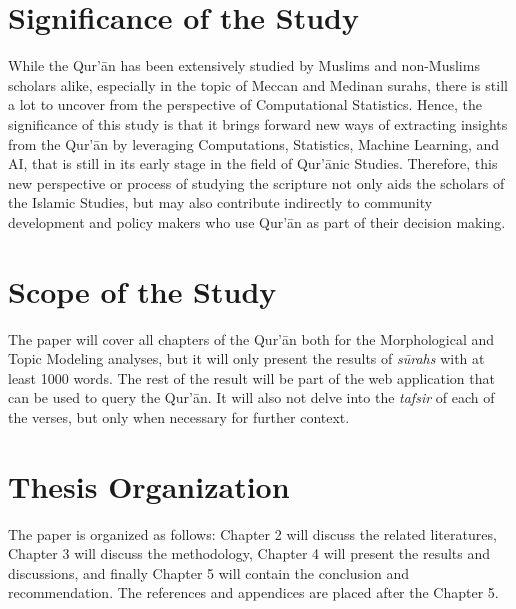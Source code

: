 \section{Significance of the Study}\label{sec:significance}
While the Qur'\=an has been extensively studied by Muslims and non-Muslims scholars alike, especially in the topic of Meccan and Medinan surahs, there is still a lot to uncover from the perspective of Computational Statistics. Hence, the significance of this study is that it brings forward new ways of extracting insights from the Qur'\=an by leveraging Computations, Statistics, Machine Learning, and AI, that is still in its early stage in the field of Qur'\=anic Studies. Therefore, this new perspective or process of studying the scripture not only aids the scholars of the Islamic Studies, but may also contribute indirectly to community development and policy makers who use Qur'\=an as part of their decision making.
\section{Scope of the Study}
The paper will cover all chapters of the Qur'\=an both for the Morphological and Topic Modeling analyses, but it will only present the results of \textit{s\=urahs}  with at least 1000 words. The rest of the result will be part of the web application that can be used to query the Qur'\=an. It will also not delve into the \textit{tafsir}  of each of the verses, but only when necessary for further context.
\section{Thesis Organization}
The paper is organized as follows: Chapter 2 will discuss the related literatures, Chapter 3 will discuss the methodology, Chapter 4 will present the results and discussions, and finally Chapter 5 will contain the conclusion and recommendation. The references and appendices are placed after the Chapter 5.